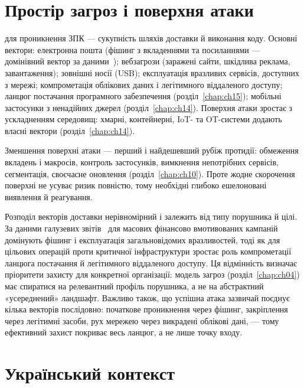 \section{Простір загроз і поверхня атаки}\label{sec:ch01-surface}

 для проникнення ЗПК --- сукупність шляхів доставки й виконання коду. Основні вектори: електронна пошта (фішинг з вкладеннями та посиланнями --- домінівний вектор за даними~\cite{ch01:dbir}); вебзагрози (заражені сайти, шкідлива реклама, завантаження); зовнішні носії (USB); експлуатація вразливих сервісів, доступних з мережі; компрометація облікових даних і легітимного віддаленого доступу; ланцюг постачання програмного забезпечення (розділ~\ref{chap:ch15}); мобільні застосунки з ненадійних джерел (розділ~\ref{chap:ch14}). Поверхня атаки зростає з ускладненням середовищ: хмарні, контейнерні, IoT- та OT-системи додають власні вектори (розділ~\ref{chap:ch14}).

Зменшення поверхні атаки --- перший і найдешевший рубіж протидії: обмеження вкладень і макросів, контроль застосунків, вимкнення непотрібних сервісів, сегментація, своєчасне оновлення (розділ~\ref{chap:ch10}). Проте жодне скорочення поверхні не усуває ризик повністю, тому необхідні глибоко ешелоновані виявлення й реагування.

Розподіл векторів доставки нерівномірний і залежить від типу порушника й цілі. За даними галузевих звітів~\cite{ch01:dbir,enisa} для масових фінансово вмотивованих кампаній домінують фішинг і експлуатація загальновідомих вразливостей, тоді як для цільових операцій проти критичної інфраструктури зростає роль компрометації ланцюга постачання й легітимного віддаленого доступу. Ця відмінність визначає пріоритети захисту для конкретної організації: модель загроз (розділ~\ref{chap:ch04}) має спиратися на релевантний профіль порушника, а не на абстрактний «усереднений» ландшафт. Важливо також, що успішна атака зазвичай поєднує кілька векторів послідовно: початкове проникнення через фішинг, закріплення через легітимні засоби, рух мережею через викрадені облікові дані, --- тому ефективний захист покриває весь ланцюг, а не лише точку входу.

\section{Український контекст}\label{sec:ch01-ukraine}

